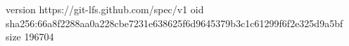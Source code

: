 version https://git-lfs.github.com/spec/v1
oid sha256:66a8f2288aa0a228cbe7231e638625f6d9645379b3c1c61299f6f2e325d9a5bf
size 196704
